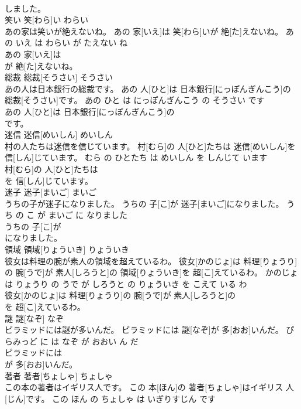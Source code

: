 \documentclass[8pt]{extreport}
\begin{document}
\begin{CJK}{UTF8}{min}
\\	しました。			
\\	笑い	笑[わら]い	わらい	
\\	あの家は笑いが絶えないね。	あの 家[いえ]は 笑[わら]いが 絶[た]えないね。	あの いえ は わらい が たえない ね	
\\	あの 家[いえ]は
\\	が 絶[た]えないね。			
\\	総裁	総裁[そうさい]	そうさい	
\\	あの人は日本銀行の総裁です。	あの 人[ひと]は 日本銀行[にっぽんぎんこう]の 総裁[そうさい]です。	あの ひと は にっぽんぎんこう の そうさい です	
\\	あの 人[ひと]は 日本銀行[にっぽんぎんこう]の
\\	です。			
\\	迷信	迷信[めいしん]	めいしん	
\\	村の人たちは迷信を信じています。	村[むら]の 人[ひと]たちは 迷信[めいしん]を 信[しん]じています。	むら の ひとたち は めいしん を しんじて います	
\\	村[むら]の 人[ひと]たちは
\\	を 信[しん]じています。			
\\	迷子	迷子[まいご]	まいご	
\\	うちの子が迷子になりました。	うちの 子[こ]が 迷子[まいご]になりました。	うち の こ が まいご に なりました	
\\	うちの 子[こ]が
\\	になりました。			
\\	領域	領域[りょういき]	りょういき	
\\	彼女は料理の腕が素人の領域を超えているわ。	彼女[かのじょ]は 料理[りょうり]の 腕[うで]が 素人[しろうと]の 領域[りょういき]を 超[こ]えているわ。	かのじょ は りょうり の うで が しろうと の りょういき を こえて いる わ	
\\	彼女[かのじょ]は 料理[りょうり]の 腕[うで]が 素人[しろうと]の
\\	を 超[こ]えているわ。			
\\	謎	謎[なぞ]	なぞ	
\\	ピラミッドには謎が多いんだ。	ピラミッドには 謎[なぞ]が 多[おお]いんだ。	ぴらみっど に は なぞ が おおい ん だ	
\\	ピラミッドには
\\	が 多[おお]いんだ。			
\\	著者	著者[ちょしゃ]	ちょしゃ	
\\	この本の著者はイギリス人です。	この 本[ほん]の 著者[ちょしゃ]はイギリス 人[じん]です。	この ほん の ちょしゃ は いぎりすじん です	

\end{CJK}
\end{document}
